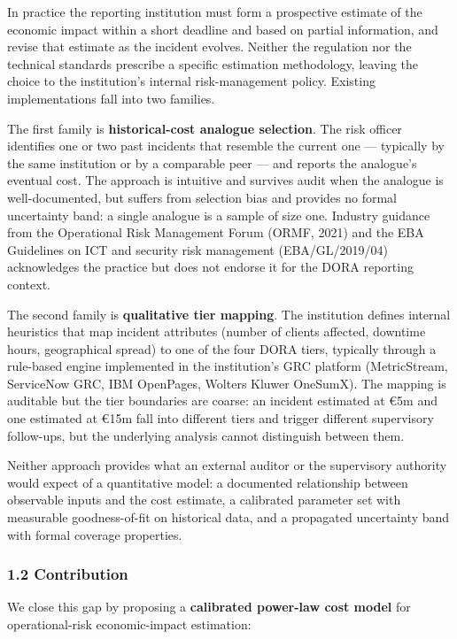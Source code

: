 \documentclass[
]{article}
\begin{document}
In practice the reporting institution must form a prospective estimate
of the economic impact within a short deadline and based on partial
information, and revise that estimate as the incident evolves. Neither
the regulation nor the technical standards prescribe a specific
estimation methodology, leaving the choice to the institution's internal
risk-management policy. Existing implementations fall into two families.

The first family is \textbf{historical-cost analogue selection}. The
risk officer identifies one or two past incidents that resemble the
current one --- typically by the same institution or by a comparable
peer --- and reports the analogue's eventual cost. The approach is
intuitive and survives audit when the analogue is well-documented, but
suffers from selection bias and provides no formal uncertainty band: a
single analogue is a sample of size one. Industry guidance from the
Operational Risk Management Forum (ORMF, 2021) and the EBA Guidelines on
ICT and security risk management (EBA/GL/2019/04) acknowledges the
practice but does not endorse it for the DORA reporting context.

The second family is \textbf{qualitative tier mapping}. The institution
defines internal heuristics that map incident attributes (number of
clients affected, downtime hours, geographical spread) to one of the
four DORA tiers, typically through a rule-based engine implemented in
the institution's GRC platform (MetricStream, ServiceNow GRC, IBM
OpenPages, Wolters Kluwer OneSumX). The mapping is auditable but the
tier boundaries are coarse: an incident estimated at €5m and one
estimated at €15m fall into different tiers and trigger different
supervisory follow-ups, but the underlying analysis cannot distinguish
between them.

Neither approach provides what an external auditor or the supervisory
authority would expect of a quantitative model: a documented
relationship between observable inputs and the cost estimate, a
calibrated parameter set with measurable goodness-of-fit on historical
data, and a propagated uncertainty band with formal coverage properties.

\subsubsection{1.2 Contribution}\label{contribution}

We close this gap by proposing a \textbf{calibrated power-law cost
model} for operational-risk economic-impact estimation:
\end{document}
